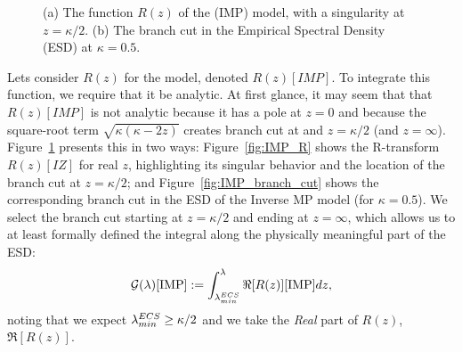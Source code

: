 \begin{figure}[t]
    \centering
    \caption{(a) The function $R(z)$ of the \InverseMP (IMP) model, with a singularity at $z = \kappa/2$. (b) The branch cut in the Empirical Spectral Density (ESD) at $\kappa = 0.5$.}
    \label{fig:R_branch_cut_combined}
\end{figure}

Lets consider $R(z)$ for the \InverseMP model, denoted $R(z)[IMP]$.
To integrate this function, we require that it be analytic.
At first glance, it may seem that that $R(z)[IMP]$ is not analytic because it
has a pole at $z=0$ and because the square-root term $\sqrt{\kappa(\kappa-2z)}$  creates branch
cut at and $z=\kappa/2$ (and $z=\infty$).
Figure~\ref{fig:R_branch_cut_combined} presents this in two ways:
Figure~\ref{fig:IMP_R} shows the R-transform $R(z)[IZ]$ for real $z$, highlighting its singular behavior and the location of the branch cut at $z = \kappa/2$; and
Figure~\ref{fig:IMP_branch_cut} shows the corresponding branch cut in the ESD of the Inverse MP model (for $\kappa = 0.5$).
We select the branch cut starting at $z=\kappa/2$ and ending at $z=\infty$,
which allows us to at least formally defined the integral along the physically meaningful part of the ESD:
\begin{equation}
\label{eqn:IMP_model_1} 
\mathcal{G(\lambda)}[\mathrm{IMP}] := \int_{\lambda^{ECS}_{min}}^{\lambda} \Re[R(z)][\mathrm{IMP}] dz  ,
\end{equation}
noting that we expect $\lambda^{ECS}_{min}\ge\kappa/2$ and we take the \emph{Real} part of $R(z)$, $\Re[R(z)]$.

